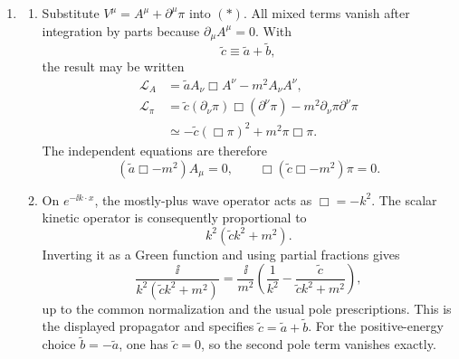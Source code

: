\begin{enumerate}
\begin{enumerate}
\begin{enumerate}
When \(\widetilde b=0\), the time derivatives of \(V^0\) and
\(V^i\) occur with opposite signs.  If \(\widetilde a>0\), a
configuration with only rapidly varying \(V^0\) has arbitrarily
negative energy; if \(\widetilde a<0\), the same is true for a spatial
component.  At \(\widetilde a=0\), the mass term
\(m^2[\mathbf V^2-(V^0)^2]\) is itself indefinite.  Hence no value of
\(\widetilde a\) makes the energy positive definite.
\item
The required relation is
\[
 \boxed{\widetilde b=-\widetilde a}.
\]
Indeed, up to a total derivative,
\[
 \mathcal L=-\frac{\widetilde a}{2}F_{\mu\nu}F^{\mu\nu}
             -m^2V_\mu V^\mu,
 \qquad
 F_{\mu\nu}=\partial_\mu V_\nu-\partial_\nu V_\mu.
\]
Its momenta are
\[
 \Pi_i=2\widetilde aF_{0\ii},\qquad \Pi_0=0.
\]
Before eliminating \(V^0\), integration by parts in the Hamiltonian
gives the \(V^0\)-dependent combination
\(V^0\partial_i\Pi_i-m^2(V^0)^2\).  Its stationary value is
\[
 V^0=\frac{\partial_i\Pi_i}{2m^2},
\]
and substitution yields
\[
 H=\int \dd^3x\left[
 \frac{\Pi_i\Pi_i}{4\widetilde a}
 +\frac{\widetilde a}{2}F_{ij}F_{ij}
 +m^2V_iV_i
 +\frac{(\partial_i\Pi_i)^2}{4m^2}
 \right].
\]
This is positive for \(\widetilde a>0\) and \(m^2>0\).  The divergence
of the field equation simultaneously becomes \(-m^2D=0\), and hence
\[
 \partial_\mu V^\mu=0
\]
for a massive field.
\end{enumerate}
\item
\begin{enumerate}
\renewcommand{\labelenumiii}{(\roman{enumiii})}
\item
Substitute \(V^\mu=A^\mu+\partial^\mu\pi\) into \((*)\).  All mixed
terms vanish after integration by parts because
\(\partial_\mu A^\mu=0\).  With
\[
 \widetilde c\equiv\widetilde a+\widetilde b,
\]
the result may be written
\[
\begin{split}
 \mathcal L_A&=\widetilde aA_\nu\Box A^\nu-m^2A_\nu A^\nu,\\
 \mathcal L_\pi
 &=\widetilde c(\partial_\nu\pi)\Box(\partial^\nu\pi)
   -m^2\partial_\nu\pi\partial^\nu\pi\\
 &\simeq-\widetilde c(\Box\pi)^2+m^2\pi\Box\pi.
\end{split}
\]
The independent equations are therefore
\[
 (\widetilde a\Box-m^2)A_\mu=0,
 \qquad
 \Box(\widetilde c\Box-m^2)\pi=0.
\]
\item
On \(e^{-\ii k\cdot x}\), the mostly-plus wave operator acts as
\(\Box=-k^2\).  The scalar kinetic operator is consequently
proportional to
\[
 k^2(\widetilde c k^2+m^2).
\]
Inverting it as a Green function and using partial fractions gives
\[
 \frac{\ii}{k^2(\widetilde c k^2+m^2)}
 =\frac{\ii}{m^2}\left(
   \frac1{k^2}-\frac{\widetilde c}
   {\widetilde c k^2+m^2}\right),
\]
up to the common normalization and the usual pole prescriptions.  This
is the displayed propagator and specifies
\(\widetilde c=\widetilde a+\widetilde b\).  For the positive-energy
choice \(\widetilde b=-\widetilde a\), one has
\(\widetilde c=0\), so the second pole term vanishes exactly.
\end{enumerate}
\end{enumerate}


\end{enumerate}
